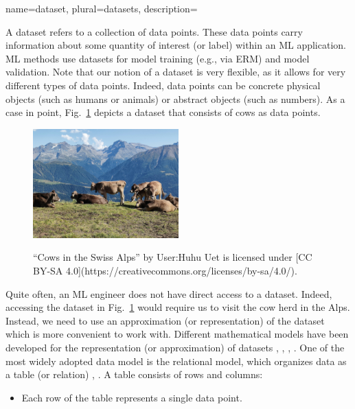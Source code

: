 {name={dataset}, plural={datasets},
	description={A dataset refers to a collection of data points. These 
		data points carry information about some quantity of interest (or label) within 
		an ML application. ML methods use datasets for model training (e.g., via ERM)
		and model validation. Note that our notion of a dataset is very flexible, as 
		it allows for very different types of data points. Indeed, data points can be concrete 
		physical objects (such as humans or animals) or abstract objects (such as numbers). 
		As a case in point, Fig.\ \ref{fig_cows_dataset} depicts a dataset that consists of cows as 
		data points. 
		\begin{figure}[H]
				\begin{center}
		\label{fig:cowsintheswissalps}
		\includegraphics[width=0.5\textwidth]{assets/Cows_in_the_Swiss_Alps.jpg}
		  \end{center}
		\caption{\label{fig_cows_dataset}“Cows in the Swiss Alps” by User:Huhu Uet is licensed under [CC BY-SA 4.0](https://creativecommons.org/licenses/by-sa/4.0/).}
	  \end{figure}
       Quite often, an ML engineer does not have direct access to a dataset. Indeed, accessing the 
       dataset in Fig.\ \ref{fig_cows_dataset} would require us to visit the cow herd in the Alps. Instead, 
       we need to use an approximation (or representation) of the dataset which is more convenient 
       to work with. Different mathematical models have been developed for the representation (or approximation) 
       of datasets \cite{silberschatz2019database}, \cite{abiteboul1995foundations}, \cite{hoberman2009data}, \cite{ramakrishnan2002database}. 
       One of the most widely adopted data model is the relational model, which organizes data 
       as a table (or relation) \cite{codd1970relational}, \cite{silberschatz2019database}.
		A table consists of rows and columns:
		\begin{itemize} 
		\item Each row of the table represents a single data point.

\end{itemize}}}
